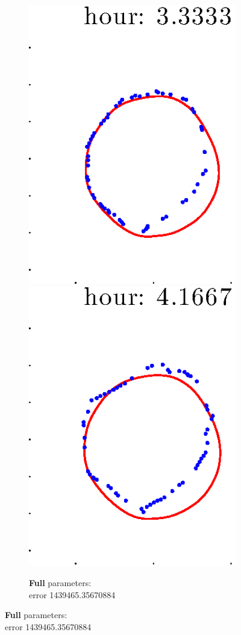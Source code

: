 \documentclass[12pt]{article}
\begin{document}
\begin{figure}[h!]
\begin{subfigure}[b]{.3\textwidth}
		\includegraphics[height=.15\textheight]{Pos14exp8/secondhalf/full5.eps}
		\includegraphics[height=.15\textheight]{Pos14exp8/secondhalf/full6.eps}
		\caption{\textbf{Full} parameters: \\error 1439465.35670884}

\end{subfigure}
\end{figure}
\end{document}
